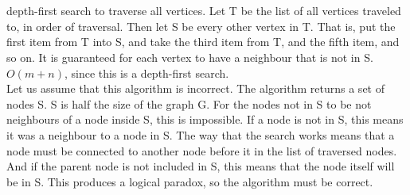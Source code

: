 \documentclass[14pt]{extarticle}
\begin{document}
\section{}

depth-first search to traverse all vertices. Let T be the list of all vertices traveled to, in order of traversal. Then let S be every other vertex in T. That is, put the first item from T into S, and take the third item from T, and the fifth item, and so on. It is guaranteed for each vertex to have a neighbour that is not in S. $O(m+n)$, since this is a depth-first search.\\

Let us assume that this algorithm is incorrect. The algorithm returns a set of nodes S. S is half the size of the graph G. For the nodes not in S to be not neighbours of a node inside S, this is impossible. If a node is not in S, this means it was a neighbour to a node in S. The way that the search works means that a node must be connected to another node before it in the list of traversed nodes. And if the parent node is not included in S, this means that the node itself will be in S. This produces a logical paradox, so the algorithm must be correct.

\end{document}
